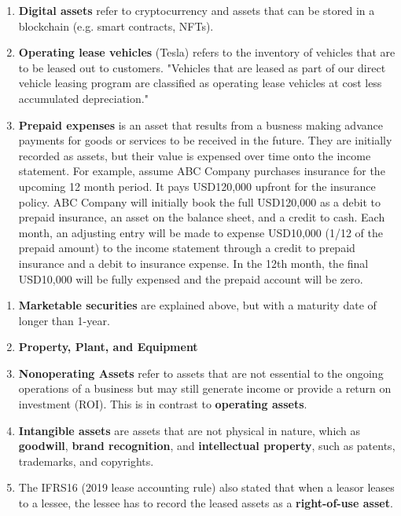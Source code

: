\documentclass{article}
\begin{document}
\begin{definition}
\begin{enumerate}
        Apple has \textbf{vendor non trade receiveables}, which are receivables from its manufacturing vendors resulting from the sale of raw material components to these vendors who manufacture sub-assemblies or assemble final products for the company. Apple purchases these raw material components directly from suppliers.
        \item \textbf{Digital assets} refer to cryptocurrency and assets that can be stored in a blockchain (e.g. smart contracts, NFTs).
        \item \textbf{Operating lease vehicles} (Tesla) refers to the inventory of vehicles that are to be leased out to customers. "Vehicles that are leased as part of our direct vehicle leasing program are classified as operating lease vehicles at cost less accumulated depreciation."
        \item \textbf{Prepaid expenses} is an asset that results from a busness making advance payments for goods or services to be received in the future. They are initially recorded as assets, but their value is expensed over time onto the income statement. For example, assume ABC Company purchases insurance for the upcoming 12 month period. It pays USD120,000 upfront for the insurance policy. ABC Company will initially book the full USD120,000 as a debit to prepaid insurance, an asset on the balance sheet, and a credit to cash. Each month, an adjusting entry will be made to expense USD10,000 (1/12 of the prepaid amount) to the income statement through a credit to prepaid insurance and a debit to insurance expense. In the 12th month, the final USD10,000 will be fully expensed and the prepaid account will be zero.
      \end{enumerate}
    \end{definition}

    \begin{definition}
      \label{def:noncurrent-fixed-assets}
      \begin{enumerate}
        \item \textbf{Marketable securities} are explained above, but with a maturity date of longer than 1-year.
        \item \textbf{Property, Plant, and Equipment}
        \item \textbf{Nonoperating Assets} refer to assets that are not essential to the ongoing operations of a business but may still generate income or provide a return on investment (ROI). This is in contrast to \textbf{operating assets}.
        \item \textbf{Intangible assets} are assets that are not physical in nature, which as \textbf{goodwill}, \textbf{brand recognition}, and \textbf{intellectual property}, such as patents, trademarks, and copyrights.
        \item The IFRS16 (2019 lease accounting rule) also stated that when a leasor leases to a lessee, the lessee has to record the leased assets as a \textbf{right-of-use asset}.
      \end{enumerate}
    \end{definition}
\end{document}
